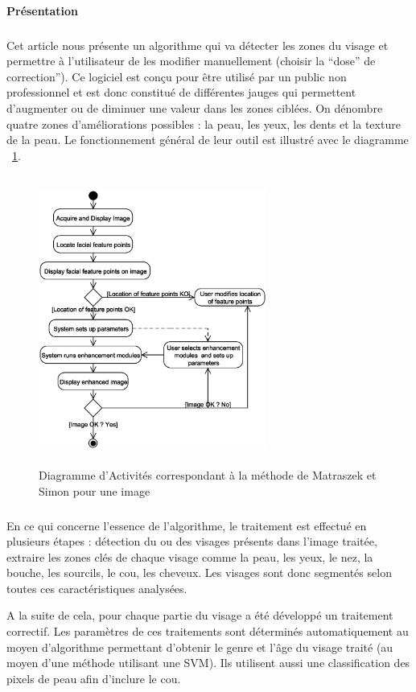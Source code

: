 \documentclass[11pt, french]{report-rd-info}
\begin{document}
\paragraph{Présentation}
\subparagraph{}
Cet article nous présente un algorithme qui va détecter les zones du visage et permettre à l'utilisateur de les modifier manuellement (choisir la “dose” de correction”). Ce logiciel est conçu pour être utilisé par un public non professionnel et est donc constitué de différentes jauges qui permettent d'augmenter ou de diminuer une valeur dans les zones ciblées. On dénombre quatre zones d'améliorations possibles : la peau, les yeux, les dents et la texture de la peau. Le fonctionnement général de leur outil est illustré avec le diagramme ~\ref{diag:diagrammebatch}.
\begin{figure}
\centering
\includegraphics[height=9.5cm,width=7.5cm]{Images/ActivityBatch.eps}
\caption{Diagramme d'Activités correspondant à la méthode de Matraszek et Simon\cite{Matraszek2004} pour une image}
\label{diag:diagrammebatch}
\end{figure}

\subparagraph{}
En ce qui concerne l’essence de l’algorithme, le traitement est effectué en plusieurs étapes : détection du ou des visages présents dans l’image traitée, extraire les zones clés de chaque visage comme la peau, les yeux, le nez, la bouche, les sourcils, le cou, les cheveux. Les visages sont donc segmentés selon toutes ces caractéristiques analysées. 

A la suite de cela, pour chaque partie du visage a été développé un traitement correctif. Les paramètres de ces traitements sont déterminés automatiquement au moyen d’algorithme permettant d’obtenir le genre et l’âge du visage traité (au moyen d’une méthode utilisant une SVM). Ils utilisent aussi une classification des pixels de peau afin d’inclure le cou.
\end{document}
